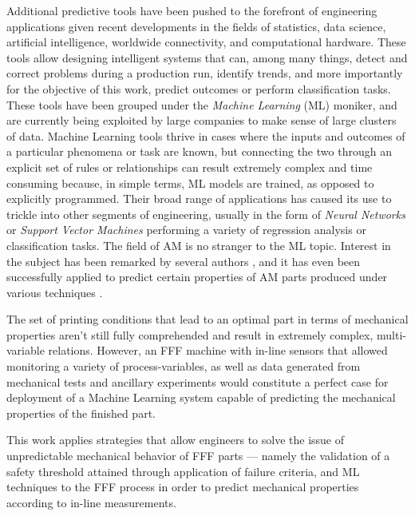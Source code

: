 \documentclass[main.tex]{subfiles}
\begin{document}
Additional predictive tools have been pushed to the forefront of engineering applications given recent developments in the fields of statistics, data science, artificial intelligence, worldwide connectivity, and computational hardware. These tools allow designing intelligent systems that can, among many things, detect and correct problems during a production run, identify trends, and more importantly for the objective of this work, predict outcomes or perform classification tasks. These tools have been grouped under the \emph{Machine Learning} (ML) moniker, and are currently being exploited by large companies to make sense of large clusters of data. Machine Learning tools thrive in cases where the inputs and outcomes of a particular phenomena or task are known, but connecting the two through an explicit set of rules or relationships can result extremely complex and time consuming \cite{Chollet2018} because, in simple terms, ML models are trained, as opposed to explicitly programmed. Their broad range of applications has caused its use to trickle into other segments of engineering, usually in the form of \emph{Neural Networks} or \emph{Support Vector Machines} performing a variety of regression analysis or classification tasks. The field of AM is no stranger to the ML topic. Interest in the subject has been remarked by several authors \cite{Qi2019, Razvi2019, Meng2020}, and it has even been successfully applied to predict certain properties of AM parts produced under various techniques \cite{Qi2019, Razvi2019, Meng2020, Sood2012}. 

The set of printing conditions that lead to an optimal part in terms of mechanical properties aren't still fully comprehended and result in extremely complex, multi-variable relations. However, an FFF machine with in-line sensors that allowed monitoring a variety of process-variables, as well as data generated from mechanical tests and ancillary experiments would constitute a perfect case for deployment of a Machine Learning system capable of predicting the mechanical properties of the finished part.

This work applies strategies that allow engineers to solve the issue of unpredictable mechanical behavior of FFF parts --- namely the validation of a safety threshold attained through application of failure criteria, and ML techniques to the FFF process in order to predict mechanical properties according to in-line measurements.

% 
%
%
%
%
%
%
%
\end{document}
